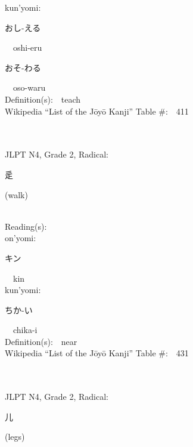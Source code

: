 \begin{multicols}{2}
{\hspace*{1em}}kun'yomi:\ \ \\
{\hspace*{2em}}{\begin{CJK}{UTF8}{min} おし-える \end{CJK}}\ \ oshi-eru\ \ \\
{\hspace*{2em}}{\begin{CJK}{UTF8}{min} おそ-わる \end{CJK}}\ \ oso-waru\ \ \\
Definition(s):\ \ teach \\
Wikipedia ``List of the J\=oy\=o Kanji'' Table \#:\ \ 411 \\
\ \ \\
{\fontsize{34pt}{40pt}  }\ \ \\  %
{JLPT N4, Grade 2, Radical:\ \ {\begin{CJK}{UTF8}{min} 辵 \end{CJK}} (walk) } \\
Reading(s):\ \ \\
{\hspace*{1em}}on'yomi:\ \ \\
{\hspace*{2em}}{\begin{CJK}{UTF8}{min} キン \end{CJK}}\ \ kin\ \ \\
{\hspace*{1em}}kun'yomi:\ \ \\
{\hspace*{2em}}{\begin{CJK}{UTF8}{min} ちか-い \end{CJK}}\ \ chika-i\ \ \\
Definition(s):\ \ near \\
Wikipedia ``List of the J\=oy\=o Kanji'' Table \#:\ \ 431 \\
\ \ \\
{\fontsize{34pt}{40pt}  }\ \ \\  %
{JLPT N4, Grade 2, Radical:\ \ {\begin{CJK}{UTF8}{min} 儿 \end{CJK}} (legs) } \\

\end{multicols}
